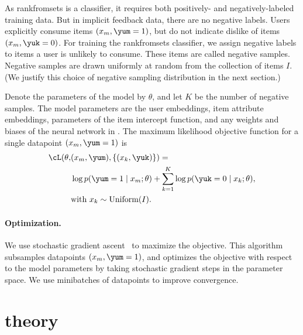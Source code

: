 As \acrshort{rankfromsets} is a classifier, it requires both positively- and
negatively-labeled training data. But in implicit feedback data, there are no
negative labels. Users explicitly consume items $(x_m, \yum = 1)$, but do not
indicate dislike of items $(x_m, \yuk = 0)$. For training the
\acrshort{rankfromsets} classifier, we assign negative labels to items a user is
unlikely to consume. These items are called negative samples. Negative samples
are drawn uniformly at random from the collection of items $I$. (We justify this
choice of negative sampling distribution in the next section.)

Denote the parameters of the model by $\theta$, and let $K$ be the number of
negative samples. The model parameters are the user embeddings, item attribute
embeddings, parameters of the item intercept function, and any weights and
biases of the neural network in . The maximum likelihood
objective function for a single datapoint $(x_m, \yum=1)$ is
\begin{align}
\begin{split}
  \cL(\theta, & (x_m, \yum), \{(x_k, \yuk)\}) =\\
  &\log p(\yum = 1 \mid x_m; \theta) + \sum_{k=1}^K \log p(\yuk = 0 \mid x_k;
  \theta),\\
  &\textrm{with}~x_k\sim\textrm{Uniform}(I).
  \label{eq:objective}
\end{split}
\end{align}

%

\paragraph{Optimization.} We use stochastic gradient ascent~\citep{Robbins:1951}
to maximize the objective. This algorithm subsamples datapoints
$(x_m, \yum = 1)$, and optimizes the objective with respect to the model
parameters by taking stochastic gradient steps in the parameter space. We use
minibatches of datapoints to improve convergence.

\section{theory}
\label{sec:theory}

